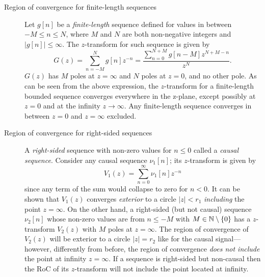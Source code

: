 \documentclass[\documentfontsize, twocolumn]{\classname}
\begin{document}
\begin{description}
    \item[Region of convergence for finite-length sequences]
Let $g[n]$ be a \emph{finite-length} sequence defined for values in between $-M \leq n \leq N$, where $M$ and $N$ are both non-negative integers and $|g[n]| \leq \infty$. The $z$-transform for such sequence is given by
\begin{equation}\label{eqn:zTransformFiniteLengthSequence}
    G(z) = \sum_{n=-M}^N g[n]z^{-n} =
    \frac {
        \sum_{n=0}^{N+M} g[n-M]z^{N+M-n}
    } {
        z^N
    }.
\end{equation}
$G(z)$ has $M$ poles at $z=\infty$ and $N$ poles at $z=0$, and no other pole. As can be seen from the above expression, the $z$-transform for a finite-length bounded sequence converges everywhere in the z-plane, except possibly at $z=0$ and at the infinity $z \rightarrow \infty$. Any finite-length sequence converges in between $z=0$ and $z=\infty$ excluded.

\item[Region of convergence for right-sided sequences] A \emph{right-sided} sequence with non-zero values for $n\leq 0$ called a \emph{causal sequence}. Consider any causal sequence $\nu_1[n]$; its $z$-transform is given by
    \begin{equation}\label{eqn:zTransformCausalSequence}
        V_1(z) = \sum_{n=0}^\infty \nu_1[n] z^{-n}
    \end{equation}
        since any term of the sum would collapse to zero for $n < 0$. It can be shown that $V_1(z)$ converges \emph{exterior} to a circle $|z| < r_1$ \emph{including} the point $z=\infty$.
        On the other hand, a right-sided (but not causal) sequence $\nu_2[n]$ whose non-zero values are from $n \leq -M$ with $M \in \mathbb N\setminus \{0\}$ has a $z$-transform $V_2(z)$ with $M$ poles at $z=\infty$. The region of convergence of $V_2(z)$ will be exterior to a circle $|z| = r_2$ like for the causal signal---however, differently from before, the region of convergence \emph{does not include} the point at infinity $z = \infty$. If a sequence is right-sided but non-causal then the RoC of its $z$-transform will not include the point located at infinity.


\end{description}
\end{document}
